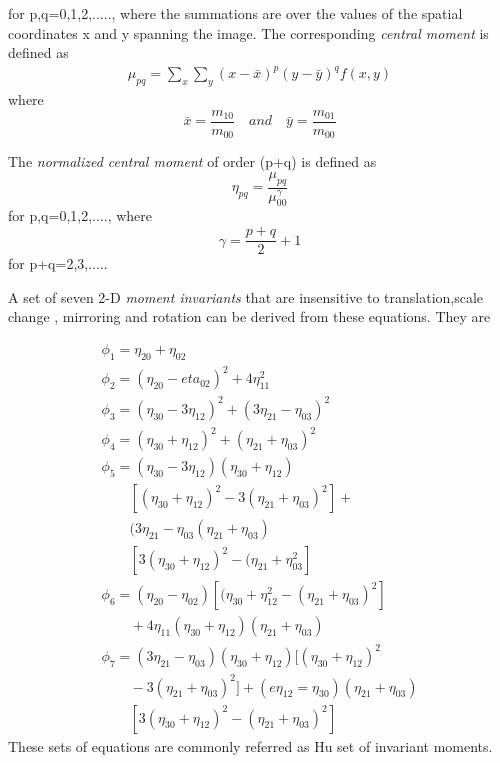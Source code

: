 for p,q=0,1,2,....., where the summations are over the values of the spatial coordinates x and y spanning the image. The corresponding \emph{central moment} is defined as 
\begin{align} \mu_{pq} = \sum_{x} \sum_{y} (x-\bar{x})^p (y-\bar{y})^q f(x,y) \end{align}
where \[ \bar{x}=\frac{m_{10}}{m_{00}} \quad and \quad \bar{y}=\frac{m_{01}}{m_{00}} \]

\par
The \emph{normalized central moment} of order (p+q) is defined as 
\[  \eta_{pq}=\frac{\mu_{pq}} {\mu_{00}^\gamma} \]
for p,q=0,1,2,...., where 
\[ \gamma=\frac {p+q} {2} +1  \]
for p+q=2,3,.....

\par
A set of seven 2-D \emph{moment invariants} that are insensitive to translation,scale change , mirroring and rotation can be derived from these equations. They are

\begin{align}
&\phi_{1}=\eta_{20} + \eta_{02} \\
&\phi_{2}=(\eta_{20} -eta_{02})^2 + 4\eta_{11}^2   \\
&\phi_{3}=(\eta_{30} -3\eta_{12})^2 + (3\eta_{21}-\eta_{03})^2  \\ 
&\phi_{4}=(\eta_{30} + \eta_{12})^2 + (\eta_{21} + \eta_{03})^2  &\\
&\phi_{5}=(\eta_{30}-3\eta_{12})(\eta_{30} + \eta_{12})  \nonumber \\
		 &\qquad [(\eta_{30}+\eta_{12})^2  - 3(\eta_{21} + \eta_{03})^2 ] + \nonumber \\
		& \qquad(3\eta_{21}-\eta_{03}  (\eta_{21}+\eta_{03}) \nonumber \\		
		&\qquad[3(\eta_{30}+\eta_{12})^2 - (\eta_{21}+\eta_{03}^2]  \\
&\phi_{6}=(\eta_{20}-\eta_{02})[(\eta_{30}+\eta_{12}^2 -(\eta_{21}+\eta_{03})^2] \nonumber\\
	&\qquad+ 4\eta_{11}(\eta_{30}+\eta_{12})(\eta_21 + \eta_{03})  \\
&\phi_{7}=(3\eta_{21} -\eta_{03})(\eta_{30}+\eta_{12})[ (\eta_{30} + \eta_{12})^2 \nonumber \\
		&\qquad-3(\eta_{21}+ \eta_{03})^2] + (e\eta_{12}=\eta_{30})(\eta_{21}+\eta_{03})\nonumber \\
		&\qquad[3(\eta_{30}+\eta_{12})^2 - (\eta_{21} + \eta_{03})^2]
\end{align}
These sets of equations are commonly referred as Hu set of invariant moments.\cite{hu62}

